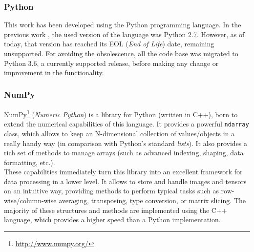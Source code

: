 \subsubsection{Python}

This work has been developed using the Python programming language. In the previous work \cite{tfg}, the used version of the language was Python 2.7. However, as of today, that version has reached its EOL (\textit{End of Life}) date, remaining unsupported. For avoiding the obsolescence, all the code base was migrated to Python 3.6, a currently supported release, before making any change or improvement in the functionality.

\subsubsection{NumPy}

NumPy\footnote{\url{http://www.numpy.org/}} (\emph{Numeric Python}) is a library for Python (written in C++), born to extend the numerical capabilities of this language. It provides a powerful \texttt{ndarray} class, which allows to keep an N-dimensional collection of values/objects in a really handy way (in comparison with Python's standard \emph{lists}). It also provides a rich set of methods to manage arrays (such as advanced indexing, shaping, data formatting, etc.).\\


These capabilities immediately turn this library into an excellent framework for data processing in a lower level. It allows to store and handle images and tensors on an intuitive way, providing methods to perform typical tasks such as row-wise/column-wise averaging, transposing, type conversion, or matrix slicing. The majority of these structures and methods are implemented using the C++ language, which provides a higher speed than a Python implementation.




